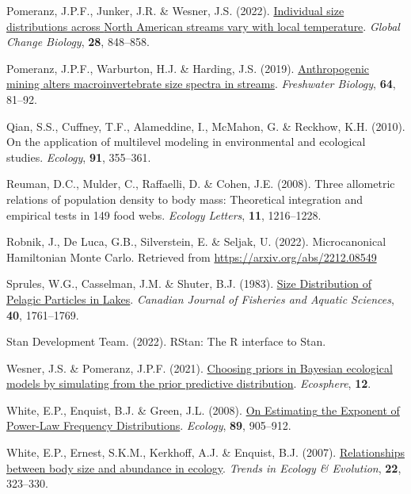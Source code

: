 \documentclass[
  12pt,
]{article}
\newlength{\cslhangindent}
\newlength{\cslentryspacingunit} %
\newenvironment{CSLReferences}[2] %
 {%
  \setlength{\parindent}{0pt}
  \ifodd #1
  \let\oldpar\par
  \def\par{\hangindent=\cslhangindent\oldpar}
  \fi
  \setlength{\parskip}{#2\cslentryspacingunit}
 }%
 {}
\begin{document}
\begin{CSLReferences}{1}{0}
\leavevmode{}%
Pomeranz, J.P.F., Junker, J.R. \& Wesner, J.S. (2022).
\href{https://doi.org/10.1111/gcb.15862}{Individual size distributions
across {North American} streams vary with local temperature}.
\emph{Global Change Biology}, \textbf{28}, 848--858.

\leavevmode{}%
Pomeranz, J.P.F., Warburton, H.J. \& Harding, J.S. (2019).
\href{https://doi.org/10.1111/fwb.13196}{Anthropogenic mining alters
macroinvertebrate size spectra in streams}. \emph{Freshwater Biology},
\textbf{64}, 81--92.

\leavevmode{}%
Qian, S.S., Cuffney, T.F., Alameddine, I., McMahon, G. \& Reckhow, K.H.
(2010). On the application of multilevel modeling in environmental and
ecological studies. \emph{Ecology}, \textbf{91}, 355--361.

\leavevmode{}%
Reuman, D.C., Mulder, C., Raffaelli, D. \& Cohen, J.E. (2008). Three
allometric relations of population density to body mass: Theoretical
integration and empirical tests in 149 food webs. \emph{Ecology
Letters}, \textbf{11}, 1216--1228.

\leavevmode{}%
Robnik, J., De Luca, G.B., Silverstein, E. \& Seljak, U. (2022).
Microcanonical {Hamiltonian Monte Carlo}. Retrieved from
\url{https://arxiv.org/abs/2212.08549}

\leavevmode{}%
Sprules, W.G., Casselman, J.M. \& Shuter, B.J. (1983).
\href{https://doi.org/10.1139/f83-205}{Size {Distribution} of {Pelagic
Particles} in {Lakes}}. \emph{Canadian Journal of Fisheries and Aquatic
Sciences}, \textbf{40}, 1761--1769.

\leavevmode{}%
Stan Development Team. (2022). {RStan}: The {R} interface to {Stan}.

\leavevmode{}%
Wesner, J.S. \& Pomeranz, J.P.F. (2021).
\href{https://doi.org/10.1002/ecs2.3739}{Choosing priors in {Bayesian}
ecological models by simulating from the prior predictive distribution}.
\emph{Ecosphere}, \textbf{12}.

\leavevmode{}%
White, E.P., Enquist, B.J. \& Green, J.L. (2008).
\href{https://doi.org/10.1890/07-1288.1}{On {Estimating} the {Exponent}
of {Power-Law Frequency Distributions}}. \emph{Ecology}, \textbf{89},
905--912.

\leavevmode{}%
White, E.P., Ernest, S.K.M., Kerkhoff, A.J. \& Enquist, B.J. (2007).
\href{https://doi.org/10.1016/j.tree.2007.03.007}{Relationships between
body size and abundance in ecology}. \emph{Trends in Ecology \&
Evolution}, \textbf{22}, 323--330.

\end{CSLReferences}
\end{document}
